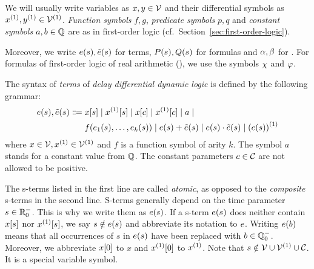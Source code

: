     We will usually write variables as $x,y\in\mathcal{V}$ and their differential symbols as $\D{x},\D{y}\in\diffvars$.
    \emph{Function symbols} $f,g$, \emph{predicate symbols} $p,q$ and \emph{constant symbols} $a,b\in\mathbb{Q}$ are as in first-order logic (cf.\ Section~\ref{sec:first-order-logic}).

    Moreover, we write $e(s),\tilde{e}(s)$ for \ddL terms, $P(s),Q(s)$ for \ddL formulas and $\alpha,\beta$ for \dHPs. For formulas of first-order logic of real arithmetic (\FOLR), we use the symbols $\chi$ and $\varphi$.

    \begin{definition}[s-Terms]\label{def:syntax-terms}
        The syntax of \emph{terms} of \emph{delay differential dynamic logic} is defined by the following grammar:
        \begin{align*}
            \astrm(s),\bstrm(s) \Coloneqq{}&
                \x[s] \mid
                \Dx[s] \mid
                \x[c] \mid
                \Dx[c] \mid
                a \mid\\
                & f(\range{\istrm{1}(s)}{\istrm{k}(s)}) \mid
                \astrm(s) + \bstrm(s) \mid
                \astrm(s) \cdot \bstrm(s) \mid
                \D{(\astrm(s))}
        \end{align*}
        where $x\in\allvars,\D{x}\in\diffvars$ and $f$ is a function symbol of arity $k$.
        The symbol $a$ stands for a constant value from $\mathbb{Q}$. The constant parameters $c\in\mathcal{C}_{}$ are not allowed to be positive.
    \end{definition}

    The s-terms listed in the first line are called \emph{atomic}, as opposed to the \emph{composite} s-terms in the second line.
    S-terms generally depend on the time parameter $s\in\mathbb{R}^-_0$. This is why we write them as $e(s)$.
    If a s-term $e(s)$ does neither contain $x[s]$ nor $\Dx[s]$, we say $s\notin e(s)$ and abbreviate its notation to $e$.
    Writing $e(b)$ means that all occurrences of $s$ in $e(s)$ have been replaced with $b\in\mathbb{Q}^-_0$.
    Moreover, we abbreviate $x[0]$ to $x$ and $\Dx[0]$ to $\D{x}$.
    Note that $s\notin\allvars\cup\diffvars\cup\constants$. It is a special variable symbol.

